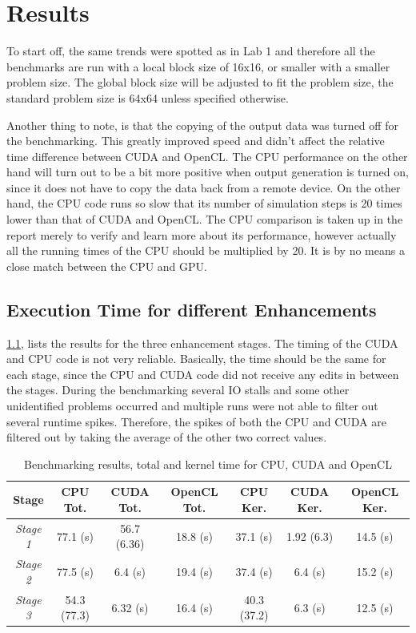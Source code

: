 \documentclass[final]{report}
\begin{document}
\chapter{Results}
To start off, the same trends were spotted as in Lab 1 and therefore all the benchmarks are run with a local block size of 16x16, or smaller with a smaller problem size.
The global block size will be adjusted to fit the problem size, the standard problem size is 64x64 unless specified otherwise.

Another thing to note, is that the copying of the output data was turned off for the benchmarking.
This greatly improved speed and didn't affect the relative time difference between CUDA and OpenCL.
The CPU performance on the other hand will turn out to be a bit more positive when output generation is turned on, since it does not have to copy the data back from a remote device.
On the other hand, the CPU code runs so slow that its number of simulation steps is 20 times lower than that of CUDA and OpenCL.
The CPU comparison is taken up in the report merely to verify and learn more about its performance, however actually all the running times of the CPU should be multiplied by 20.
It is by no means a close match between the CPU and GPU.

\section{Execution Time for different Enhancements}
\cref{tab:results}, lists the results for the three enhancement stages.
The timing of the CUDA and CPU code is not very reliable.
Basically, the time should be the same for each stage, since the CPU and CUDA code did not receive any edits in between the stages.
During the benchmarking several IO stalls and some other unidentified problems occurred and multiple runs were not able to filter out several runtime spikes.
Therefore, the spikes of both the CPU and CUDA are filtered out by taking the average of the other two correct values.

\begin{table}[H]
	\centering
	\caption{Benchmarking results, total and kernel time for CPU, CUDA and OpenCL}
	\label{tab:results}
	\begin{tabular}{ccccccc}
		\toprule
			\textbf{Stage}		& \textbf{CPU Tot.}	& \textbf{CUDA Tot.}	& \textbf{OpenCL Tot.}	& \textbf{CPU Ker.}	& \textbf{CUDA Ker.}	& \textbf{OpenCL Ker.}\\
		\midrule
			\textit{Stage 1}	& 77.1 (s)			& 56.7 (6.36)			& 18.8 (s) 				& 37.1 (s) 			& 1.92 (6.3)			& 14.5 (s)	\\
			\textit{Stage 2}	& 77.5 (s)			& 6.4 (s) 				& 19.4 (s) 				& 37.4 (s) 			& 6.4 (s) 				& 15.2 (s)	\\
			\textit{Stage 3}	& 54.3 (77.3)		& 6.32 (s) 				& 16.4 (s) 				& 40.3 (37.2) 		& 6.3 (s) 				& 12.5 (s)	\\
		\bottomrule
	\end{tabular}
\end{table}
\end{document}
